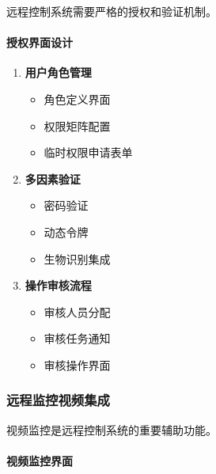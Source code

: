 远程控制系统需要严格的授权和验证机制。

\paragraph{授权界面设计}\label{ux6388ux6743ux754cux9762ux8bbeux8ba1}

\begin{enumerate}
\def\labelenumi{\arabic{enumi}.}
\tightlist
\item
  \textbf{用户角色管理}

  \begin{itemize}
  \tightlist
  \item
    角色定义界面
  \item
    权限矩阵配置
  \item
    临时权限申请表单
  \end{itemize}
\item
  \textbf{多因素验证}

  \begin{itemize}
  \tightlist
  \item
    密码验证
  \item
    动态令牌
  \item
    生物识别集成
  \end{itemize}
\item
  \textbf{操作审核流程}

  \begin{itemize}
  \tightlist
  \item
    审核人员分配
  \item
    审核任务通知
  \item
    审核操作界面
  \end{itemize}
\end{enumerate}

\subsubsection{远程监控视频集成}\label{ux8fdcux7a0bux76d1ux63a7ux89c6ux9891ux96c6ux6210}

视频监控是远程控制系统的重要辅助功能。

\paragraph{视频监控界面}\label{ux89c6ux9891ux76d1ux63a7ux754cux9762}

